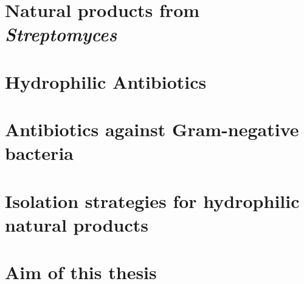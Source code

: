 
\section{Natural products from \textit{Streptomyces}} %
\label{sec:natural_products_from_it}


\section{Hydrophilic Antibiotics} %
\label{sec:hydrophilic_antibiotics}


\section{Antibiotics against Gram-negative bacteria} %
\label{sec:antibiotics_against_gram_negative_bacteria}


\section{Isolation strategies for hydrophilic natural products} %
\label{sec:isolation_strategies_for_hydrophilic_natural_products}


\section{Aim of this thesis} %
\label{sec:aim_of_this_thesis}

